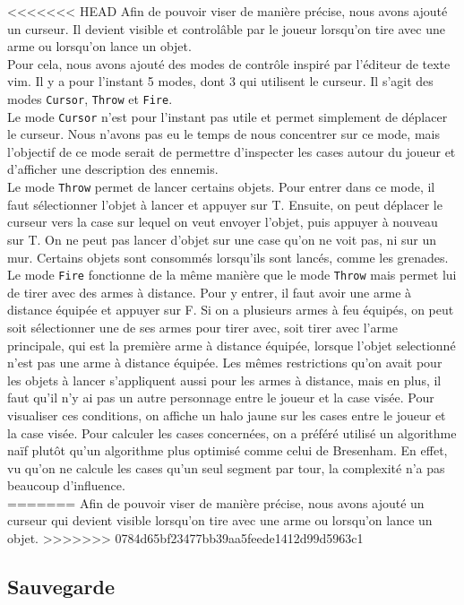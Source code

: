 \documentclass[10pt,a4paper]{article}
\begin{document}
<<<<<<< HEAD
Afin de pouvoir viser de manière précise, nous avons ajouté un curseur. Il devient visible et control\^able par le joueur lorsqu'on tire avec une arme ou lorsqu'on lance un objet.\\
Pour cela, nous avons ajouté des modes de contr\^ole inspiré par l'éditeur de texte vim. Il y a pour l'instant 5 modes, dont 3 qui utilisent le curseur. Il s'agit des modes \texttt{Cursor}, \texttt{Throw} et \texttt{Fire}.\\
Le mode \texttt{Cursor} n'est pour l'instant pas utile et permet simplement de déplacer le curseur. Nous n'avons pas eu le temps de nous concentrer sur ce mode, mais l'objectif de ce mode serait de permettre d'inspecter les cases autour du joueur et d'afficher une description des ennemis.\\
Le mode \texttt{Throw} permet de lancer certains objets. Pour entrer dans ce mode, il faut sélectionner l'objet à lancer et appuyer sur T. Ensuite, on peut déplacer le curseur vers la case sur lequel on veut envoyer l'objet, puis appuyer à nouveau sur T. On ne peut pas lancer d'objet sur une case qu'on ne voit pas, ni sur un mur. Certains objets sont consommés lorsqu'ils sont lancés, comme les grenades.\\
Le mode \texttt{Fire} fonctionne de la même manière que le mode \texttt{Throw} mais permet lui de tirer avec des armes à distance. Pour y entrer, il faut avoir une arme à distance équipée et appuyer sur F. Si on a plusieurs armes à feu équipés, on peut soit sélectionner une de ses armes pour tirer avec, soit tirer avec l'arme principale, qui est la première arme à distance équipée, lorsque l'objet selectionné n'est pas une arme à distance équipée. Les mêmes restrictions qu'on avait pour les objets à lancer s'appliquent aussi pour les armes à distance, mais en plus, il faut qu'il n'y ai pas un autre personnage entre le joueur et la case visée. Pour visualiser ces conditions, on affiche un halo jaune sur les cases entre le joueur et la case visée. Pour calculer les cases concernées, on a préféré utilisé un algorithme naïf plut\^ot qu'un algorithme plus optimisé comme celui de Bresenham. En effet, vu qu'on ne calcule les cases qu'un seul segment par tour, la complexité n'a pas beaucoup d'influence.\\
=======
Afin de pouvoir viser de manière précise, nous avons ajouté un curseur qui devient visible lorsqu'on tire avec une arme ou lorsqu'on lance un objet.
>>>>>>> 0784d65bf23477bb39aa5feede1412d99d5963c1

\subsection{Sauvegarde}
\end{document}
